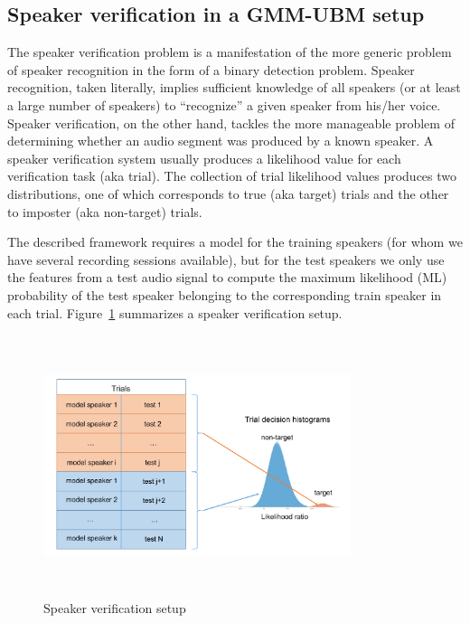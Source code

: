 \subsection{Speaker verification in a GMM-UBM setup} 
\label{ssec:ch3_GMMUBM}
The speaker verification problem is a manifestation of the more generic problem of speaker recognition in the form of a binary detection problem. 
Speaker recognition, taken literally, implies sufficient knowledge of all speakers (or at least a large number of speakers) to ``recognize'' a given speaker from his/her voice. 
Speaker verification, on the other hand, tackles the more manageable problem of determining whether an audio segment was produced by a known speaker. 
A speaker verification system usually produces a likelihood value for each verification task (aka trial). 
The collection of trial likelihood values produces two distributions, one of which corresponds to true (aka target) trials and the other to imposter (aka non-target) trials. 

The described framework requires a model for the training speakers (for whom we have several recording sessions available), but for the test speakers we only use the features from a test audio signal to compute the maximum likelihood (ML) probability of the test speaker belonging to the corresponding train speaker in each trial. 
Figure~\ref{fig:ch3_speaker_verification} summarizes a speaker verification setup. 

\begin{figure}[h!]
	\centering
	\vspace{0mm}
	\includegraphics[height = 3in, width=0.8\textwidth]{figures/speaker_verification_setup}
	\vspace{-3mm}
	\caption{ Speaker verification setup}
	\label{fig:ch3_speaker_verification}
	\vspace{0mm}
\end{figure}

